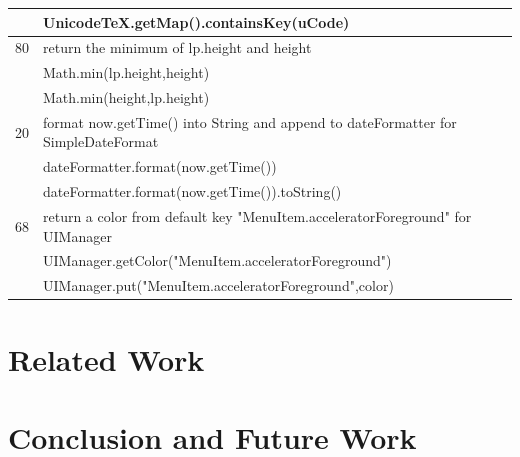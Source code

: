 \documentclass[sigconf,review,anonymous]{article}
\begin{document}
\begin{table}[]
\begin{tabular}{|l|l|}
                                  & \multirow{-2}{*}{\cellcolor[HTML]{DAE8FC}UnicodeTeX.getMap().containsKey(uCode)}            \\ \hline
\multicolumn{1}{|r|}{80}          & return the minimum of lp.height and height                                                  \\ \hline
\rowcolor[HTML]{FFCCC9} 
                                  & Math.min(lp.height,height)                                                                  \\ \hline
\rowcolor[HTML]{FFCCC9} 
                                  & Math.min(height,lp.height)                                                                  \\ \hline
\multicolumn{1}{|r|}{20}          & format now.getTime() into String and append to dateFormatter for SimpleDateFormat           \\ \hline
\rowcolor[HTML]{FFCCC9} 
                                  & dateFormatter.format(now.getTime())                                                         \\ \hline
\rowcolor[HTML]{FFCCC9} 
                                  & dateFormatter.format(now.getTime()).toString()                                              \\ \hline
\multicolumn{1}{|r|}{68}          & return a color from default key "MenuItem.acceleratorForeground" for UIManager              \\ \hline
\rowcolor[HTML]{FFCCC9} 
                                  & UIManager.getColor("MenuItem.acceleratorForeground")                                        \\ \hline
\rowcolor[HTML]{FFCCC9} 
                                  & UIManager.put("MenuItem.acceleratorForeground",color)                                       \\ \hline
\end{tabular}
\end{table}

\section{Related Work}
\section{Conclusion and Future Work}

\clearpage
{}

\end{document}
